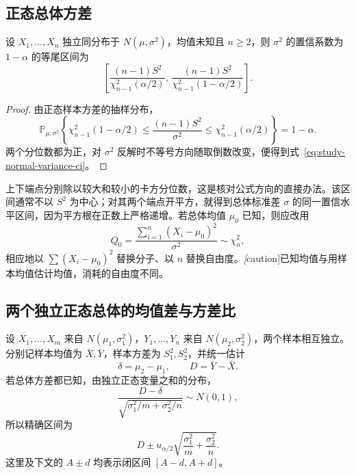 \subsection{正态总体方差}
\label{subsec:study-normal-variance-intervals}

\begin{theorem}
\label{thm:study-normal-variance-interval}
设 $X_1,\ldots,X_n$ 独立同分布于 $N(\mu,\sigma^2)$，均值未知且 $n\ge2$，则 $\sigma^2$ 的置信系数为 $1-\alpha$ 的等尾区间为
\begin{equation}
  \left[
    \frac{(n-1)S^2}{\chi_{n-1}^2(\alpha/2)},\,
    \frac{(n-1)S^2}{\chi_{n-1}^2(1-\alpha/2)}
  \right].
  \label{eq:study-normal-variance-ci}
\end{equation}
\end{theorem}
\begin{proof}
由正态样本方差的抽样分布，
\[
  \mathbb P_{\mu,\sigma^2}\left\{
    \chi_{n-1}^2(1-\alpha/2)
    \le\frac{(n-1)S^2}{\sigma^2}
    \le\chi_{n-1}^2(\alpha/2)
  \right\}=1-\alpha.
\]
两个分位数都为正，对 $\sigma^2$ 反解时不等号方向随取倒数改变，便得到式~\eqref{eq:study-normal-variance-ci}。
\end{proof}

上下端点分别除以较大和较小的卡方分位数，这是核对公式方向的直接办法。该区间通常不以 $S^2$ 为中心；对其两个端点开平方，就得到总体标准差 $\sigma$ 的同一置信水平区间，因为平方根在正数上严格递增。若总体均值 $\mu_0$ 已知，则应改用
\begin{equation}
  Q_0=\frac{\sum_{i=1}^n(X_i-\mu_0)^2}{\sigma^2}
      \sim\chi_n^2,
  \label{eq:study-normal-known-mean-variance-pivot}
\end{equation}
相应地以 $\sum(X_i-\mu_0)^2$ 替换分子、以 $n$ 替换自由度。\emph[caution]{已知均值与用样本均值估计均值，消耗的自由度不同。}

\subsection{两个独立正态总体的均值差与方差比}
\label{subsec:study-two-normal-intervals}

设 $X_1,\ldots,X_m$ 来自 $N(\mu_1,\sigma_1^2)$，$Y_1,\ldots,Y_n$ 来自 $N(\mu_2,\sigma_2^2)$，两个样本相互独立。分别记样本均值为 $\bar X,\bar Y$，样本方差为 $S_1^2,S_2^2$，并统一估计
\[
  \delta=\mu_2-\mu_1,\qquad D=\bar Y-\bar X.
\]
若总体方差都已知，由独立正态变量之和的分布，
\[
  \frac{D-\delta}{\sqrt{\sigma_1^2/m+\sigma_2^2/n}}
  \sim N(0,1),
\]
所以精确区间为
\begin{equation}
  D\pm u_{\alpha/2}\sqrt{\frac{\sigma_1^2}{m}
                              +\frac{\sigma_2^2}{n}}.
  \label{eq:study-two-normal-known-ci}
\end{equation}
这里及下文的 $A\pm d$ 均表示闭区间 $[A-d,A+d]$。

